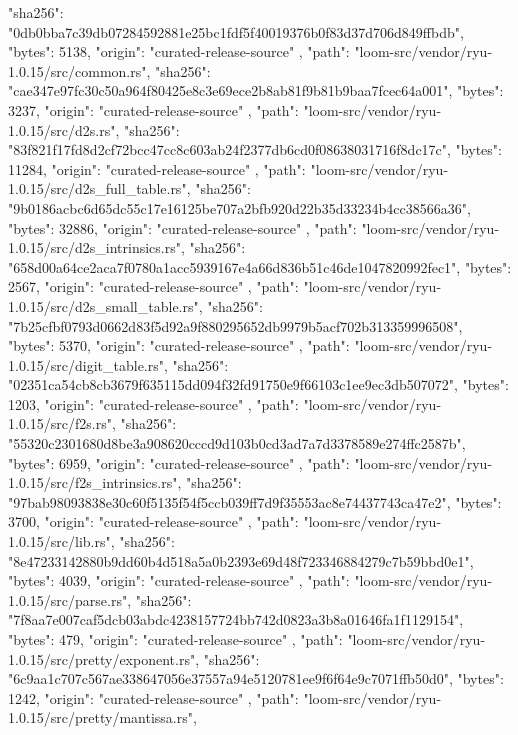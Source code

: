 {{      "sha256": "0db0bba7c39db07284592881e25bc1fdf5f40019376b0f83d37d706d849ffbdb",
      "bytes": 5138,
      "origin": "curated-release-source"
    },
    {
      "path": "loom-src/vendor/ryu-1.0.15/src/common.rs",
      "sha256": "cae347e97fc30c50a964f80425e8c3e69ece2b8ab81f9b81b9baa7fcec64a001",
      "bytes": 3237,
      "origin": "curated-release-source"
    },
    {
      "path": "loom-src/vendor/ryu-1.0.15/src/d2s.rs",
      "sha256": "83f821f17fd8d2cf72bcc47cc8c603ab24f2377db6cd0f08638031716f8dc17c",
      "bytes": 11284,
      "origin": "curated-release-source"
    },
    {
      "path": "loom-src/vendor/ryu-1.0.15/src/d2s_full_table.rs",
      "sha256": "9b0186acbc6d65dc55c17e16125be707a2bfb920d22b35d33234b4cc38566a36",
      "bytes": 32886,
      "origin": "curated-release-source"
    },
    {
      "path": "loom-src/vendor/ryu-1.0.15/src/d2s_intrinsics.rs",
      "sha256": "658d00a64ce2aca7f0780a1acc5939167e4a66d836b51c46de1047820992fec1",
      "bytes": 2567,
      "origin": "curated-release-source"
    },
    {
      "path": "loom-src/vendor/ryu-1.0.15/src/d2s_small_table.rs",
      "sha256": "7b25cfbf0793d0662d83f5d92a9f880295652db9979b5acf702b313359996508",
      "bytes": 5370,
      "origin": "curated-release-source"
    },
    {
      "path": "loom-src/vendor/ryu-1.0.15/src/digit_table.rs",
      "sha256": "02351ca54cb8cb3679f635115dd094f32fd91750e9f66103c1ee9ec3db507072",
      "bytes": 1203,
      "origin": "curated-release-source"
    },
    {
      "path": "loom-src/vendor/ryu-1.0.15/src/f2s.rs",
      "sha256": "55320c2301680d8be3a908620cccd9d103b0cd3ad7a7d3378589e274ffc2587b",
      "bytes": 6959,
      "origin": "curated-release-source"
    },
    {
      "path": "loom-src/vendor/ryu-1.0.15/src/f2s_intrinsics.rs",
      "sha256": "97bab98093838e30c60f5135f54f5ccb039ff7d9f35553ac8e74437743ca47e2",
      "bytes": 3700,
      "origin": "curated-release-source"
    },
    {
      "path": "loom-src/vendor/ryu-1.0.15/src/lib.rs",
      "sha256": "8e47233142880b9dd60b4d518a5a0b2393e69d48f723346884279c7b59bbd0e1",
      "bytes": 4039,
      "origin": "curated-release-source"
    },
    {
      "path": "loom-src/vendor/ryu-1.0.15/src/parse.rs",
      "sha256": "7f8aa7e007caf5dcb03abdc4238157724bb742d0823a3b8a01646fa1f1129154",
      "bytes": 479,
      "origin": "curated-release-source"
    },
    {
      "path": "loom-src/vendor/ryu-1.0.15/src/pretty/exponent.rs",
      "sha256": "6c9aa1c707c567ae338647056e37557a94e5120781ee9f6f64e9c7071ffb50d0",
      "bytes": 1242,
      "origin": "curated-release-source"
    },
    {
      "path": "loom-src/vendor/ryu-1.0.15/src/pretty/mantissa.rs",
}}
